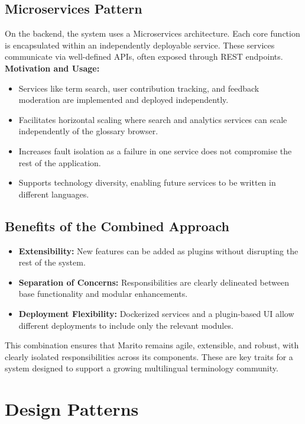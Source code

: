 \documentclass[12pt]{article}
\begin{document}
\subsection{Microservices Pattern}
On the backend, the system uses a Microservices architecture. Each core function is encapsulated within an independently deployable service. These services communicate via well-defined APIs, often exposed through REST endpoints.
\newline
\textbf{Motivation and Usage:}
\begin{itemize}
    \item Services like term search, user contribution tracking, and feedback moderation are implemented and deployed independently.
    \item Facilitates horizontal scaling where search and analytics services can scale independently of the glossary browser.
    \item Increases fault isolation as a failure in one service does not compromise the rest of the application.
    \item Supports technology diversity, enabling future services to be written in different languages.
\end{itemize}

\subsection{Benefits of the Combined Approach}
\begin{itemize}
    \item \textbf{Extensibility:} New features can be added as plugins without disrupting the rest of the system.
    \item \textbf{Separation of Concerns:} Responsibilities are clearly delineated between base functionality and modular enhancements.
    \item \textbf{Deployment Flexibility:} Dockerized services and a plugin-based UI allow different deployments to include only the relevant modules.
\end{itemize}
\newline
This combination ensures that Marito remains agile, extensible, and robust, with clearly isolated responsibilities across its components. These are key traits for a system designed to support a growing multilingual terminology community.

\section{Design Patterns}
\end{document}
